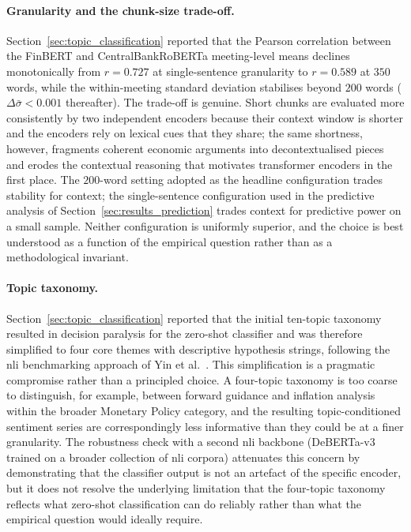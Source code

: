 \paragraph{Granularity and the chunk-size trade-off.} Section~\ref{sec:topic_classification} reported that the Pearson correlation between the FinBERT and CentralBankRoBERTa meeting-level means declines monotonically from $r = 0.727$ at single-sentence granularity to $r = 0.589$ at $350$ words, while the within-meeting standard deviation stabilises beyond $200$ words ($\Delta\bar{\sigma} < 0.001$ thereafter). The trade-off is genuine. Short chunks are evaluated more consistently by two independent encoders because their context window is shorter and the encoders rely on lexical cues that they share; the same shortness, however, fragments coherent economic arguments into decontextualised pieces and erodes the contextual reasoning that motivates transformer encoders in the first place. The $200$-word setting adopted as the headline configuration trades stability for context; the single-sentence configuration used in the predictive analysis of Section~\ref{sec:results_prediction} trades context for predictive power on a small sample. Neither configuration is uniformly superior, and the choice is best understood as a function of the empirical question rather than as a methodological invariant.

\paragraph{Topic taxonomy.} Section~\ref{sec:topic_classification} reported that the initial ten-topic taxonomy resulted in decision paralysis for the zero-shot classifier and was therefore simplified to four core themes with descriptive hypothesis strings, following the \gls{nli} benchmarking approach of Yin et al.\ \cite{yin2019benchmarking}. This simplification is a pragmatic compromise rather than a principled choice. A four-topic taxonomy is too coarse to distinguish, for example, between forward guidance and inflation analysis within the broader Monetary Policy category, and the resulting topic-conditioned sentiment series are correspondingly less informative than they could be at a finer granularity. The robustness check with a second \gls{nli} backbone (DeBERTa-v3 \cite{laurer2024deberta} trained on a broader collection of \gls{nli} corpora) attenuates this concern by demonstrating that the classifier output is not an artefact of the specific encoder, but it does not resolve the underlying limitation that the four-topic taxonomy reflects what zero-shot classification can do reliably rather than what the empirical question would ideally require.

